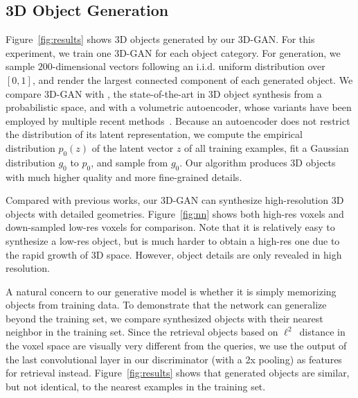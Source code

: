 \documentclass{article}
\newcommand{\fig}[1]{Figure~\ref{#1}}
\newcommand{\model}{3D-GAN\xspace}
\newcommand{\presubsection}{\vspace{-8pt}}
\newcommand{\postsubsection}{\vspace{-6pt}}
\begin{document}
\presubsection
\subsection{3D Object Generation}
\postsubsection

\fig{fig:results} shows 3D objects generated by our \model. 
For this experiment, we train one \model for each object category. For generation, we sample $200$-dimensional vectors following an i.i.d. uniform distribution over $[0,1]$, and render the largest connected component of each generated object. 
We compare \model with \cite{wu20153d}, the state-of-the-art in 3D object synthesis from a probabilistic space, and with a volumetric autoencoder, whose variants have been employed by multiple recent methods~\citep{girdhar2016learning,sharma2016vconv}. Because an autoencoder does not restrict the distribution of its latent representation, we compute the empirical distribution $p_0(z)$ of the latent vector $z$ of all training examples, fit a Gaussian distribution $g_0$ to $p_0$, and sample from $g_0$. Our algorithm produces 3D objects with much higher quality and more fine-grained details.

Compared with previous works, our \model can synthesize high-resolution 3D objects with detailed geometries. \fig{fig:nn} shows both high-res voxels and down-sampled low-res voxels for comparison. Note that it is relatively easy to synthesize a low-res object, but is much harder to obtain a high-res one due to the rapid growth of 3D space. However, object details are only revealed in high resolution. 

A natural concern to our generative model is whether it is simply memorizing objects from training data. 
To demonstrate that the network can generalize beyond the training set, we compare synthesized objects with their nearest neighbor in the training set. Since the retrieval objects based on $\ell^2$~distance in the voxel space are visually very different from the queries, we use the output of the last convolutional layer in our discriminator (with a 2x pooling) as features for retrieval instead.
\fig{fig:results} shows that generated objects are similar, but not identical, to the nearest examples in the training set. 
\end{document}
